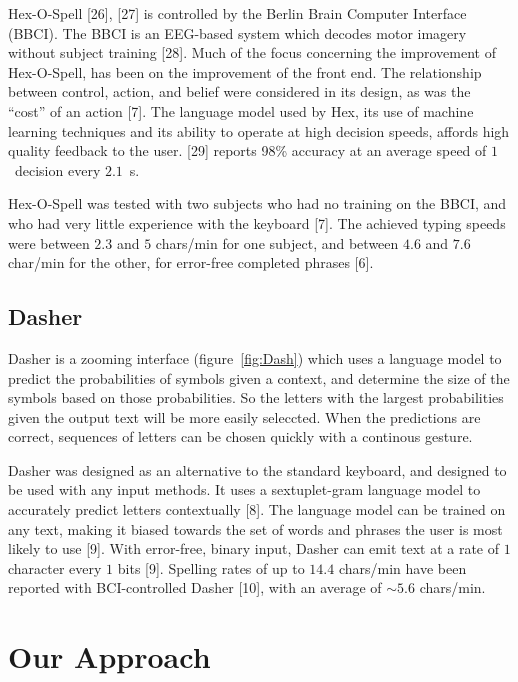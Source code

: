 \documentclass[12pt,titlepage]{article}
\begin{document}
Hex-O-Spell [26], [27] is controlled by the Berlin Brain Computer Interface (BBCI).  The BBCI is an EEG-based
system which decodes motor imagery without subject training [28].  Much of the  focus 
concerning the improvement of Hex-O-Spell, has been on the improvement of the front end.  The 
relationship between control, action, and belief were considered in its design, as was the ``cost'' of an 
action [7].  The language model used by Hex,  its use of machine learning techniques and its ability to 
operate at high decision speeds, affords high quality feedback to the user. [29] reports 98\% accuracy at 
an average speed of $1$~decision every  $2.1$~s.

Hex-O-Spell was tested with two subjects who had no training on the BBCI, and who had very little 
experience with the keyboard [7].  The achieved typing speeds were between $2.3$ and $5$ chars/min for 
one subject, and between $4.6$ and $7.6$ char/min for the other, for error-free completed phrases [6].

\subsection{Dasher}

Dasher is a zooming interface (figure~\ref{fig:Dash}) which uses a language model to predict the probabilities of 
symbols given a context, and determine the size of the symbols based on those probabilities.  So the 
letters with the largest probabilities given the output text will be more easily seleccted.  When the 
predictions are correct, sequences of letters can be chosen quickly with a continous gesture.

Dasher was designed as an alternative to the standard keyboard, and designed to be used with any input 
methods.  It uses a sextuplet-gram language model to accurately predict letters contextually [8]. The 
language model can be trained on any text, making it biased towards the set of words and phrases the 
user is most likely to use [9].  With error-free, binary input, Dasher can emit text at a rate of $1$ character 
every $1$ bits [9].  Spelling rates of up to $14.4$ chars/min have been reported with BCI-controlled Dasher [10], 
with an average of $\sim5.6$ chars/min.


\section{Our Approach}
\end{document}
